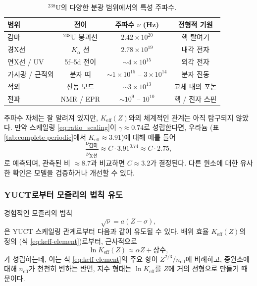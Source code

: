 \documentclass[12pt,a4paper]{article}
\begin{document}
	\begin{table}[htbp]
		\centering
		\caption{\(^{238}\mathrm{U}\)의 다양한 분광 범위에서의 특성 주파수.}
		\label{tab:uranium_spectrum}
		\begin{tabular}{@{}lccc@{}}
			\toprule
			\textbf{범위} & \textbf{전이} & \textbf{주파수 \(\nu\) (Hz)} & \textbf{전형적 기원} \\
			\midrule
			감마 & \(^{238}\mathrm{U}\) 붕괴선 & \(2.42\times10^{20}\) & 핵 탈여기 \\
			경X선 & \(K_\alpha\) 선 & \(2.78\times10^{19}\) & 내각 전자 \\
			연X선 / UV & 5f–5d 전이 & \(\sim 4\times10^{15}\) & 외각 전자 \\
			가시광 / 근적외 & 분자 띠 & \(\sim 1\times10^{15}\) – \(3\times10^{14}\) & 분자 진동 \\
			적외 & 진동 모드 & \(\sim 3\times10^{13}\) & 고체 내의 포논 \\
			전파 & NMR / EPR & \(\sim 10^9\) – \(10^{10}\) & 핵 / 전자 스핀 \\
			\bottomrule
		\end{tabular}
	\end{table}
	
	주파수 자체는 잘 알려져 있지만, \(K_{\mathrm{eff}}(Z)\)와의 체계적인 관계는 아직 탐구되지 않았다. 만약 스케일링 \eqref{eq:ratio_scaling}이 \(\gamma \approx 0.74\)로 성립한다면, 우라늄 (표 \ref{tab:complete-periodic}에서 \(K_{\mathrm{eff}}\approx 3.91\))에 대해 예를 들어
	\[
	\frac{\nu_{\text{감마}}}{\nu_{\text{X선}}} \approx C \cdot 3.91^{0.74} \approx C \cdot 2.75,
	\]
	로 예측되며, 관측된 비 \(\approx 8.7\)과 비교하면 \(C \approx 3.2\)가 결정된다. 다른 원소에 대한 유사한 확인은 모델을 검증하거나 개선할 수 있다.
	
	\subsubsection{YUCT로부터 모즐리의 법칙 유도}
	\label{sec:moseley_derivation}
	
	경험적인 모즐리의 법칙
	\begin{equation}
		\sqrt{\nu} = a (Z - \sigma),
		\label{eq:moseley_empirical}
	\end{equation}
	은 YUCT 스케일링 관계로부터 다음과 같이 유도될 수 있다. 배위 효율 \(K_{\mathrm{eff}}(Z)\)의 정의 (식 \ref{eq:keff-element})로부터, 근사적으로
	\[
	\ln K_{\mathrm{eff}}(Z) \approx \alpha Z + \text{상수},
	\]
	가 성립하는데, 이는 식 \ref{eq:keff-element}의 주요 항이 \(Z^{2/3}/n_{\mathrm{eff}}\)에 비례하고, 중원소에 대해 \(n_{\mathrm{eff}}\)가 천천히 변하는 반면, 지수 형태는 \(\ln K_{\mathrm{eff}}\)를 \(Z\)에 거의 선형으로 만들기 때문이다.
	
\end{document}
